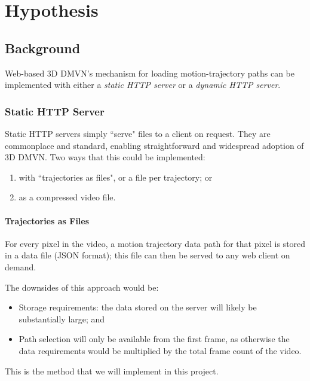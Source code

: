 \chapter{Hypothesis}

\section{Background}
Web-based 3D DMVN's mechanism for loading motion-trajectory paths can be implemented with either a \emph{static HTTP server} or a \emph{dynamic HTTP server}.

\subsection{Static HTTP Server}
Static HTTP servers simply ``serve" files to a client on request.\cite{staticweb} They are commonplace and standard, enabling straightforward and widespread adoption of 3D DMVN. Two ways that this could be implemented:
\begin{enumerate}
\item with ``trajectories as files", or a file per trajectory; or
\item as a compressed video file.
\end{enumerate}

\subsubsection{Trajectories as Files}
For every pixel in the video, a motion trajectory data path for that pixel is stored in a data file (JSON format); this file can then be served to any web client on demand.
\par The downsides of this approach would be:
\begin{itemize}
    \item Storage requirements: the data stored on the server will likely be substantially large; and
    \item Path selection will only be available from the first frame, as otherwise the data requirements would be multiplied by the total frame count of the video.
\end{itemize}
\par This is the method that we will implement in this project.
